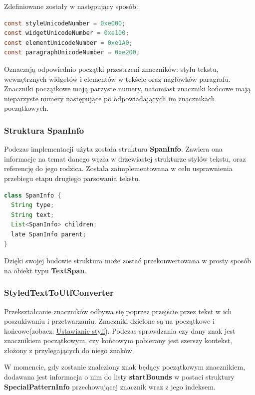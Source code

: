 \noindent Zdefiniowane zostały w następujący sposób:

\begin{lstlisting}[language=java]
const styleUnicodeNumber = 0xe000;
const widgetUnicodeNumber = 0xe100;
const elementUnicodeNumber = 0xe1A0;
const paragraphUnicodeNumber = 0xe200;
\end{lstlisting}

Oznaczają odpowiednio początki przestrzeni znaczników: stylu tekstu, wewnętrznych widgetów i elementów w tekście oraz nagłówków paragrafu.
Znaczniki początkowe mają parzyste numery, natomiast znaczniki końcowe mają nieparzyste numery następujące po odpowiadających im znacznikach początkowych.

\subsubsection{Struktura SpanInfo}

Podczas implementacji użyta została struktura \textbf{SpanInfo}. Zawiera ona informacje na temat danego węzła w drzewiastej strukturze stylów tekstu, oraz referencję do jego rodzica.
Została zaimplementowana w celu usprawnienia przebiegu etapu drugiego parsowania tekstu.

\begin{lstlisting}[language=java]
class SpanInfo {
  String type;
  String text;
  List<SpanInfo> children;
  late SpanInfo parent;
}
\end{lstlisting}

Dzięki swojej budowie struktura może zostać przekonwertowana w prosty sposób na obiekt typu \textbf{TextSpan}.

\subsubsection{StyledTextToUtfConverter}

Przekształcanie znaczników odbywa się poprzez przejście przez tekst w ich poszukiwaniu i przetwarzaniu. Znaczniki dzielone są na początkowe i końcowe(zobacz: \hyperref[subsec:ustawianieStyli]{Ustawianie styli}). Podczas sprawdzania czy dany znak jest znacznikiem początkowym, czy końcowym pobierany jest szerszy kontekst, złożony z przylegających do niego znaków.

W momencie, gdy zostanie znaleziony znak będący początkowym znacznikiem, dodawana jest informacja o nim do listy \textbf{startBounds} w postaci struktury \textbf{SpecialPatternInfo} przechowującej znacznik wraz z jego indeksem.

